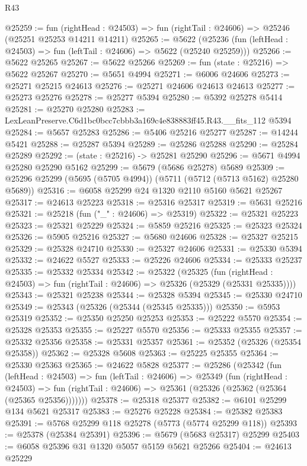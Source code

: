 \begin{lexlean}{R43}
\begin{coremodule}
@25259 := fun (rightHead : @24503) =>
  fun (rightTail : @24606) => @25246 (@25251 @25253 @14211 @14211)
@25265 := @5622
    (@25236 (fun (leftHead : @24503) => fun (leftTail : @24606) => @5622 (@25240 @25259)))
@25266 := @5622 @25265
@25267 := @5622 @25266
@25269 := fun (state : @25216) => @5622 @25267
@25270 := @5651 @4994
@25271 := @6006 @24606
@25273 := @25271 @25215 @24613
@25276 := @25271 @24606 @24613 @24613
@25277 := @25273 @25276
@25278 := @25277 @5394
@25280 := @5392 @25278 @5414
@25281 := @25270 @25280
@25283 := LexLeanPreserve.C6d1bc0bcc7cbbb3a169c4e838883ff45.R43.__fits_112 @5394
@25284 := @5657 @25283
@25286 := @5406 @25216 @25277
@25287 := @14244 @5421
@25288 := @25287 @5394
@25289 := @25286 @25288
@25290 := @25284 @25289
@25292 := (state : @25216) -> @25281 @25290
@25296 := @5671 @4994 @25280 @25290 @5162
@25299 := @5679 (@5686 @25278) @5689
@25309 := @25296 @25299 (@5695 (@5705 @4994)) (@5711 (@5712 (@5713 @5162) @25280 @5689))
@25316 := @6058 @25299 @24 @1320 @2110 @5160 @5621 @25267
@25317 := @24613 @25223
@25318 := @25316 @25317
@25319 := @5631 @25216
@25321 := @25218 (fun ("_" : @24606) => @25319)
@25322 := @25321 @25223
@25323 := @25321 @25229
@25324 := @5859 @25216
@25325 := @25323 @25324
@25326 := @5905 @25216
@25327 := @5680 @24606
@25328 := @25327 @25215
@25329 := @25328 @24710
@25330 := @25327 @24606
@25331 := @25330 @5394
@25332 := @24622 @5527
@25333 := @25226 @24606
@25334 := @25333 @25237
@25335 := @25332 @25334
@25342 := @25322
    (@25325
      (fun (rightHead : @24503) => fun (rightTail : @24606) => @25326 (@25329 (@25331 @25335))))
@25343 := @25321 @25238
@25344 := @25328 @5394
@25345 := @25330 @24710
@25349 := @25343 (@25326 (@25344 (@25345 @25335)))
@25350 := @5953 @25319
@25352 := @25350 @25250 @25253
@25353 := @25222 @5570
@25354 := @25328 @25353
@25355 := @25227 @5570
@25356 := @25333 @25355
@25357 := @25332 @25356
@25358 := @25331 @25357
@25361 := @25352 (@25326 (@25354 @25358))
@25362 := @25328 @5608
@25363 := @25225 @25355
@25364 := @25330 @25363
@25365 := @24622 @5828
@25377 := @25286
    (@25342
      (fun (leftHead : @24503) =>
      fun (leftTail : @24606) =>
      @25349
        (fun (rightHead : @24503) =>
        fun (rightTail : @24606) => @25361 (@25326 (@25362 (@25364 (@25365 @25356)))))))
@25378 := @25318 @25377
@25382 := @6101 @25299 @134 @5621 @25317
@25383 := @25276 @25228
@25384 := @25382 @25383
@25391 := @5768 @25299 @118 @25278 (@5773 (@5774 @25299 @118))
@25393 := @25378 (@25384 @25391)
@25396 := @5679 (@5683 @25317) @25299
@25403 := @6058 @25396 @31 @1320 @5057 @5159 @5621 @25266
@25404 := @24613 @25229

\end{coremodule}
\end{lexlean}
